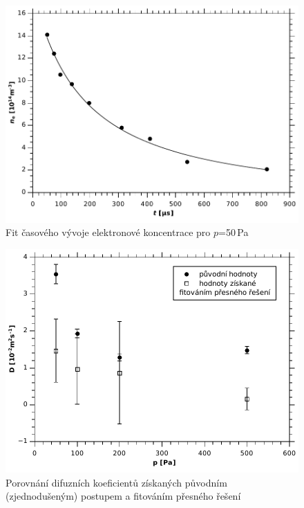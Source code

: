 \documentclass[12pt]{article}
\begin{document}
\begin{figure}[htbp]
\begin{center}
\includegraphics[width=13cm]{fit50Pa.pdf}
\caption{Fit časového vývoje elektronové koncentrace pro $p$=50\,Pa}
\label{fit50}
\end{center}
\end{figure}

\begin{figure}[htbp]
\begin{center}
\includegraphics[width=12cm]{difuzefinal.pdf}
\caption{Porovnání difuzních koeficientů získaných původním (zjednodušeným) postupem a fitováním přesného řešení}
\label{difuzefinal}
\end{center}
\end{figure}
\end{document}
